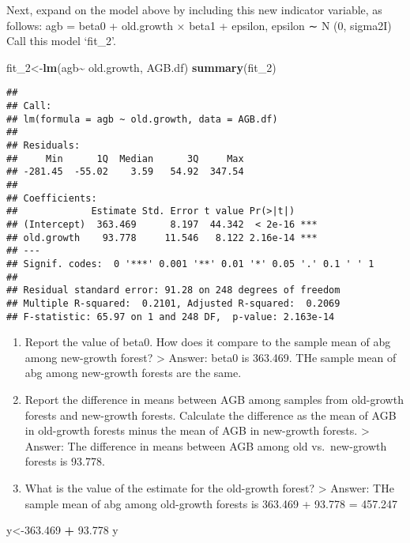 \documentclass[
]{article}
\newenvironment{Shaded}{\begin{snugshade}}{\end{snugshade}}
\newcommand{\FloatTok}[1]{\textcolor[rgb]{0.00,0.00,0.81}{#1}}
\newcommand{\FunctionTok}[1]{\textcolor[rgb]{0.13,0.29,0.53}{\textbf{#1}}}
\newcommand{\NormalTok}[1]{#1}
\newcommand{\OtherTok}[1]{\textcolor[rgb]{0.56,0.35,0.01}{#1}}
\newcommand{\SpecialCharTok}[1]{\textcolor[rgb]{0.81,0.36,0.00}{\textbf{#1}}}
\begin{document}
Next, expand on the model above by including this new indicator
variable, as follows: agb = beta0 + old.growth × beta1 + epsilon,
epsilon ∼ N (0, sigma2I) Call this model `fit\_2'.

\begin{Shaded}
\begin{Highlighting}[]
\NormalTok{fit\_2}\OtherTok{\textless{}{-}}\FunctionTok{lm}\NormalTok{(agb}\SpecialCharTok{\textasciitilde{}}\NormalTok{ old.growth, AGB.df)}
\FunctionTok{summary}\NormalTok{(fit\_2)}
\end{Highlighting}
\end{Shaded}

\begin{verbatim}
## 
## Call:
## lm(formula = agb ~ old.growth, data = AGB.df)
## 
## Residuals:
##     Min      1Q  Median      3Q     Max 
## -281.45  -55.02    3.59   54.92  347.54 
## 
## Coefficients:
##             Estimate Std. Error t value Pr(>|t|)    
## (Intercept)  363.469      8.197  44.342  < 2e-16 ***
## old.growth    93.778     11.546   8.122 2.16e-14 ***
## ---
## Signif. codes:  0 '***' 0.001 '**' 0.01 '*' 0.05 '.' 0.1 ' ' 1
## 
## Residual standard error: 91.28 on 248 degrees of freedom
## Multiple R-squared:  0.2101, Adjusted R-squared:  0.2069 
## F-statistic: 65.97 on 1 and 248 DF,  p-value: 2.163e-14
\end{verbatim}

\begin{enumerate}
\def\labelenumi{\alph{enumi}.}
\item
  Report the value of beta0. How does it compare to the sample mean of
  abg among new-growth forest? \textgreater{} Answer: beta0 is 363.469.
  THe sample mean of abg among new-growth forests are the same.
\item
  Report the difference in means between AGB among samples from
  old-growth forests and new-growth forests. Calculate the difference as
  the mean of AGB in old-growth forests minus the mean of AGB in
  new-growth forests. \textgreater{} Answer: The difference in means
  between AGB among old vs.~new-growth forests is 93.778.
\item
  What is the value of the estimate for the old-growth forest?
  \textgreater{} Answer: THe sample mean of abg among old-growth forests
  is 363.469 + 93.778 = 457.247
\end{enumerate}

\begin{Shaded}
\begin{Highlighting}[]
\NormalTok{y}\OtherTok{\textless{}{-}}\FloatTok{363.469} \SpecialCharTok{+} \FloatTok{93.778}
\NormalTok{y}
\end{Highlighting}
\end{Shaded}
\end{document}
